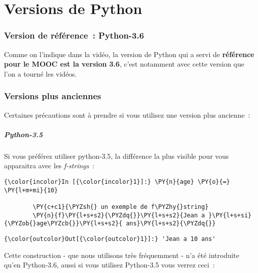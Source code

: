     
    
    
    

    

    \hypertarget{versions-de-python}{%
\section{Versions de Python}\label{versions-de-python}}

    \hypertarget{version-de-ruxe9fuxe9rence-python-3.6}{%
\subsubsection{Version de référence~:
Python-3.6}\label{version-de-ruxe9fuxe9rence-python-3.6}}

    Comme on l'indique dans la vidéo, la version de Python qui a servi de
\textbf{référence pour le MOOC est la version 3.6}, c'est notamment avec
cette version que l'on a tourné les vidéos.

    \hypertarget{versions-plus-anciennes}{%
\subsubsection{Versions plus anciennes}\label{versions-plus-anciennes}}

    Certaines précautions sont à prendre si vous utilisez une version plus
ancienne~:

    \hypertarget{python-3.5}{%
\subparagraph{Python-3.5}\label{python-3.5}}

    Si vous préférez utiliser python-3.5, la différence la plus visible pour
vous apparaitra avec les \emph{f-strings}~:

    \begin{Verbatim}[commandchars=\\\{\}]
{\color{incolor}In [{\color{incolor}1}]:} \PY{n}{age} \PY{o}{=} \PY{l+m+mi}{10}
        
        \PY{c+c1}{\PYZsh{} un exemple de f\PYZhy{}string}
        \PY{n}{f}\PY{l+s+s2}{\PYZdq{}}\PY{l+s+s2}{Jean a }\PY{l+s+si}{\PYZob{}age\PYZcb{}}\PY{l+s+s2}{ ans}\PY{l+s+s2}{\PYZdq{}}
\end{Verbatim}


\begin{Verbatim}[commandchars=\\\{\}]
{\color{outcolor}Out[{\color{outcolor}1}]:} 'Jean a 10 ans'
\end{Verbatim}
            
    Cette construction - que nous utilisons très fréquemment - n'a été
introduite qu'en Python-3.6, aussi si vous utilisez Python-3.5 vous
verrez ceci~:

